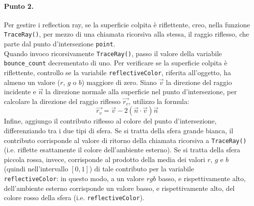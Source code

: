 \documentclass[a4paper, 12pt]{article}
\begin{document}
\paragraph{Punto 2.}
Per gestire i reflection ray, se la superficie colpita è riflettente, creo, nella funzione \texttt{TraceRay()}, per mezzo di una chiamata ricorsiva alla stessa, il raggio riflesso, che parte dal punto d'intersezione \texttt{point}.\\
Quando invoco ricorsivamente \texttt{TraceRay()}, passo il valore della variabile \texttt{bounce\_count} decrementato di uno. Per verificare se la superficie colpita è riflettente, controllo se la variabile \texttt{reflectiveColor}, riferita all'oggetto, ha almeno un valore ($r$, $g$ o $b$) maggiore di zero. Siano $\vec{v}$ la direzione del raggio incidente e $\vec{n}$ la direzione normale alla superficie nel punto d'intersezione, per calcolare la direzione del raggio riflesso $\overrightarrow{r_v}$, utilizzo la formula:
\[ \overrightarrow{r_v} = \vec{v} - 2 (\vec{n} \cdot \vec{v}) \vec{n} \]
Infine, aggiungo il contributo riflesso al colore del punto d'intersezione, differenziando tra i due tipi di sfera. Se si tratta della sfera grande bianca, il contributo corrisponde al valore di ritorno della chiamata ricorsiva a \texttt{TraceRay()} (i.e. riflette esattamente il colore dell'ambiente esterno). Se si tratta della sfera piccola rossa, invece, corrisponde al prodotto della media dei valori $r$, $g$ e $b$ (quindi nell'intervallo $[0, 1]$) di tale contributo per la variabile \texttt{reflectiveColor}: in questo modo, a un valore $rgb$ basso, e rispettivamente alto, dell'ambiente esterno corrisponde un valore basso, e rispettivamente alto, del colore rosso della sfera (i.e. \texttt{reflectiveColor}).
\end{document}
